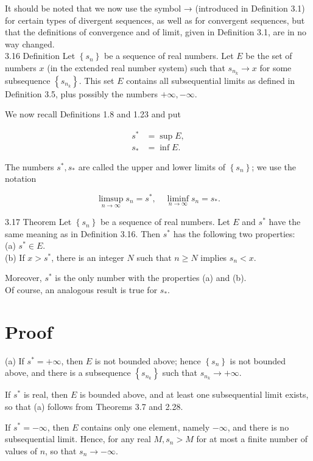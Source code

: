 \documentclass[10pt]{article}
\begin{document}
It should be noted that we now use the symbol → (introduced in Definition 3.1) for certain types of divergent sequences, as well as for convergent sequences, but that the definitions of convergence and of limit, given in Definition 3.1, are in no way changed.\\
3.16 Definition Let $\left\{s_{n}\right\}$ be a sequence of real numbers. Let $E$ be the set of numbers $x$ (in the extended real number system) such that $s_{n_{k}} \rightarrow x$ for some subsequence $\left\{s_{n_{k}}\right\}$. This set $E$ contains all subsequential limits as defined in Definition 3.5, plus possibly the numbers $+\infty,-\infty$.

We now recall Definitions 1.8 and 1.23 and put

$$
\begin{aligned}
s^{*} & =\sup E, \\
s_{*} & =\inf E .
\end{aligned}
$$

The numbers $s^{*}, s_{*}$ are called the upper and lower limits of $\left\{s_{n}\right\}$; we use the notation

$$
\limsup _{n \rightarrow \infty} s_{n}=s^{*}, \quad \liminf _{n \rightarrow \infty} s_{n}=s_{*} .
$$

3.17 Theorem Let $\left\{s_{n}\right\}$ be a sequence of real numbers. Let $E$ and $s^{*}$ have the same meaning as in Definition 3.16. Then $s^{*}$ has the following two properties:\\
(a) $s^{*} \in E$.\\
(b) If $x>s^{*}$, there is an integer $N$ such that $n \geq N$ implies $s_{n}<x$.

Moreover, $s^{*}$ is the only number with the properties (a) and (b).\\
Of course, an analogous result is true for $s_{*}$.

\section*{Proof}
(a) If $s^{*}=+\infty$, then $E$ is not bounded above; hence $\left\{s_{n}\right\}$ is not bounded above, and there is a subsequence $\left\{s_{n_{k}}\right\}$ such that $s_{n_{k}} \rightarrow+\infty$.

If $s^{*}$ is real, then $E$ is bounded above, and at least one subsequential limit exists, so that (a) follows from Theorems 3.7 and 2.28.

If $s^{*}=-\infty$, then $E$ contains only one element, namely $-\infty$, and there is no subsequential limit. Hence, for any real $M, s_{n}>M$ for at most a finite number of values of $n$, so that $s_{n} \rightarrow-\infty$.
\end{document}
